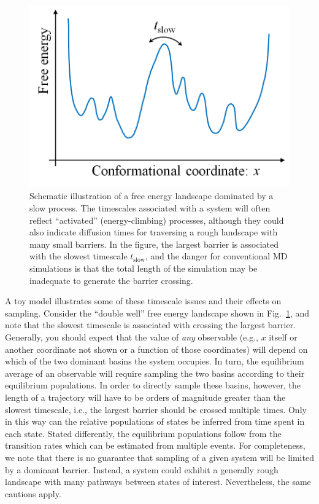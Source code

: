 \begin{figure}
  \centering
  \includegraphics[width=0.9\linewidth]{figures/1d-landscape-tslow}
  \caption{
  \label{fig:landscape} 
  Schematic illustration of a free energy landscape dominated by a slow process.
  The timescales associated with a system will often reflect ``activated'' (energy-climbing) processes, although they could also indicate diffusion times for traversing a rough landscape with many small barriers.
  In the figure, the largest barrier is associated with the slowest timescale $t_{\mathrm{slow}}$, and the danger for conventional MD simulations is that the total length of the simulation may be inadequate to generate the barrier crossing.
  }
\end{figure}

A toy model illustrates some of these timescale issues and their effects on sampling.
Consider the ``double well'' free energy landscape shown in Fig.\ \ref{fig:landscape}, and note that the slowest timescale is associated with crossing the largest barrier.  Generally, you should expect that the value of \emph{any} observable (e.g., $x$ itself or another coordinate not shown or a function of those coordinates) will depend on which of the two dominant basins the system occupies.  In turn, the equilibrium average of an observable will require sampling the two basins according to their equilibrium populations.  In order to directly sample these basins, however, the length of a trajectory will have to be orders of magnitude greater than the slowest timescale, i.e., the largest barrier should be crossed multiple times.  Only in this way can the relative populations of states be inferred from time spent in each state.  Stated differently, the equilibrium populations follow from the transition rates \cite{Zuckerman2011,Chou11,Kolmogoroff1936} which can be estimated from multiple events.  For completeness, we note that there is no guarantee that sampling of a given system will be limited by a dominant barrier.  Instead, a system could exhibit a generally rough landscape with many pathways between states of interest.
Nevertheless, the same cautions apply.

